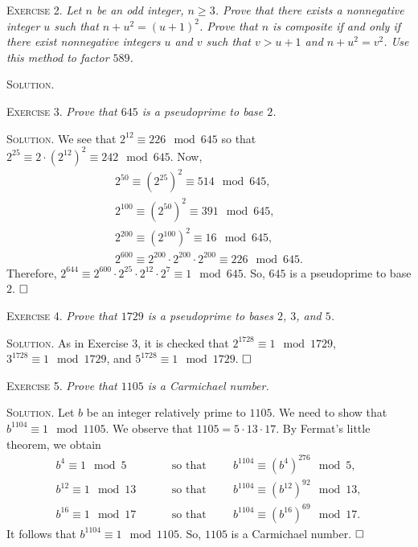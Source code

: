\documentclass[11pt, leqno]{article}
\newcommand{\done}{\ensuremath{\hfill\square}}
\begin{document}
\textsc{Exercise 2}. \emph{Let $n$ be an odd integer, $n\geq 3$. Prove that there exists a nonnegative integer $u$ such that $n+u^2 = (u+1)^2$. Prove that $n$ is composite if and only if there exist nonnegative integers $u$ and $v$ such that $v > u + 1$ and $n+u^2 = v^2$. Use this method to factor $589$.}

\textsc{Solution}.

\textsc{Exercise 3}. \emph{Prove that $645$ is a pseudoprime to base $2$.}

\textsc{Solution}. We see that $2^{12}\equiv 226 \mod 645$ so that $2^{25} \equiv 2\cdot (2^{12})^2 \equiv 242 \mod 645$. Now,
\begin{align*}
  2^{50} \equiv (2^{25})^2 \equiv 514 \mod 645, \\
  2^{100} \equiv (2^{50})^2 \equiv  391 \mod 645, \\
  2^{200} \equiv (2^{100})^2 \equiv 16 \mod 645, \\
  2^{600} \equiv 2^{200}\cdot 2^{200} \cdot 2^{200} \equiv 226 \mod 645.
\end{align*}
Therefore, $2^{644} \equiv 2^{600} \cdot 2^{25} \cdot 2^{12} \cdot 2^7 \equiv 1 \mod 645$. So, $645$ is a pseudoprime to base $2$. \done

\textsc{Exercise 4}. \emph{Prove that $1729$ is a pseudoprime to bases $2$, $3$, and $5$.}

\textsc{Solution}. As in Exercise $3$, it is checked that $2^{1728} \equiv 1 \mod 1729$, $3^{1728} \equiv 1 \mod 1729$, and $5^{1728} \equiv 1 \mod 1729$. \done

\textsc{Exercise 5}. \emph{Prove that $1105$ is a Carmichael number.}

\textsc{Solution}. Let $b$ be an integer relatively prime to $1105$. We need to show that $b^{1104} \equiv 1 \mod 1105$. We observe that $1105 = 5 \cdot 13 \cdot 17$. By Fermat's little theorem, we obtain 
\begin{align*}
  b^4 \equiv 1 \mod 5 \hspace{1cm} &\text{so that} \hspace{1cm} b^{1104} \equiv (b^4)^{276} \mod 5,\\
  b^{12} \equiv 1 \mod 13 \hspace{1cm} &\text{so that} \hspace{1cm} b^{1104} \equiv (b^{12})^{92} \mod 13,\\
  b^{16} \equiv 1 \mod 17 \hspace{1cm} &\text{so that} \hspace{1cm} b^{1104} \equiv (b^{16})^{69} \mod 17.
\end{align*}
It follows that $b^{1104} \equiv 1 \mod 1105$. So, $1105$ is a Carmichael number. \done
\end{document}
